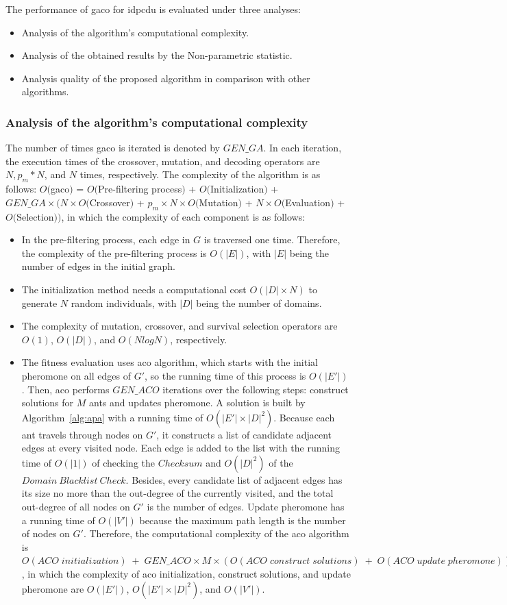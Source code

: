 The performance of \acrshort{gaco} for \gls{idpcdu} is evaluated under three analyses:
\begin{itemize}
	\item Analysis of the algorithm's computational complexity.
	\item Analysis of the obtained results by the Non-parametric statistic.
	\item Analysis quality of the proposed algorithm in comparison with other algorithms.
\end{itemize}

\subsubsection{ Analysis of the algorithm's computational complexity}
The number of times \acrshort{gaco} is iterated is denoted by $GEN\_GA$. In each iteration, the execution times of the crossover, mutation, and decoding operators are $N, p_m * N$, and $N$ times, respectively. The complexity of the algorithm is as follows:
$O($\acrshort{gaco}$)$ = $O($Pre-filtering process$)$ + $O($Initialization$)$ + $GEN\_GA\times \bigg(N \times O($Crossover$)$ + $p_{m}\times N\times O($Mutation$)$ + $N\times O($Evaluation$)$ + $O($Selection$)\bigg)$, in which the complexity of each component is as follows:
\begin{itemize}
	\item In the pre-filtering process, each edge in $G$ is traversed  one time. Therefore, the complexity of the pre-filtering process is $O(|E|)$, with $|E|$ being the number of edges in the initial graph.
	\item The initialization method needs a computational cost $O(|D|\times N)$ to generate $N$ random individuals, with $|D|$ being the number of domains.
	\item The complexity of mutation, crossover, and survival selection operators are $O(1)$, $O(|D|)$, and $O(NlogN)$, respectively.
	\item The fitness evaluation uses \gls{aco} algorithm, which starts with the initial pheromone on all edges of $G'$, so the running time of this process is $O(|E'|)$. Then, \gls{aco} performs $GEN\_ACO$ iterations over the following steps: construct solutions for $M$ ants and updates pheromone. A solution is built by Algorithm~\ref{alg:apa} with a running time of $O(|E'|\times |D|^2)$. Because each ant travels through nodes on $G'$, it constructs a list of candidate adjacent edges at every visited node. Each edge is added to the list with the running time of $O(|1|)$ of checking the $Checksum$ and $O(|D|^2)$ of the $Domain~Blacklist~Check$. Besides, every candidate list of adjacent edges has its size no more than the out-degree of the currently visited, and the total out-degree of all nodes on $G'$ is the number of edges. Update pheromone has a running time of $O(|V'|)$ because the maximum path length is the number of nodes on $G'$. Therefore, the computational complexity of the \gls{aco} algorithm is $O(ACO\;initialization)\;+\;GEN\_ACO\times M\times (O(ACO\;construct\;solutions)\;+\;O(ACO\;update\;pheromone))$, in which the complexity of \gls{aco} initialization, construct solutions, and update pheromone are $O(|E'|)$, $O(|E'|\times |D|^2)$, and $O(|V'|)$.
\end{itemize}
